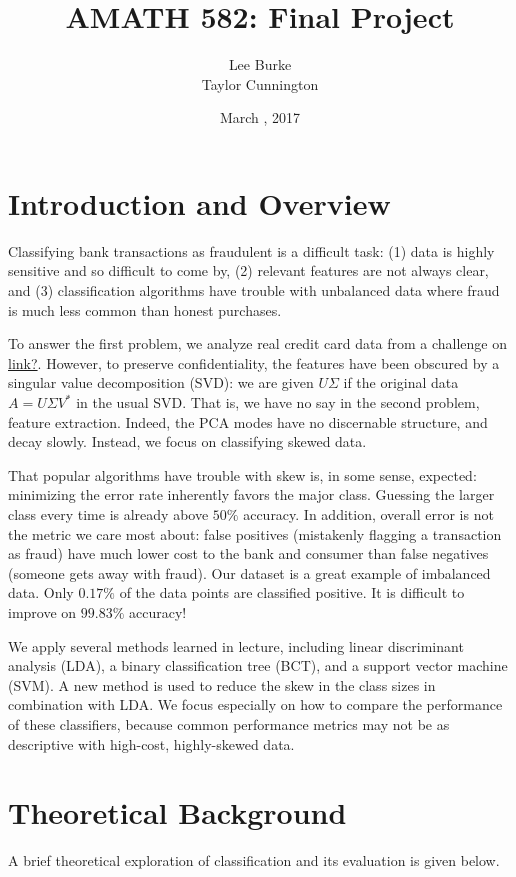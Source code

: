 \documentclass{article}
\title{AMATH 582: Final Project}
\date{March \nth{16}, 2017}
\author{Lee Burke \\ Taylor Cunnington}
\begin{document}
\maketitle
\abstract{
}
\section{Introduction and Overview}
Classifying bank transactions as fraudulent is a difficult task: (1) data is highly sensitive and so difficult to come by, (2) relevant features are not always clear, and (3) classification algorithms have trouble with unbalanced data where fraud is much less common than honest purchases. 


To answer the first problem, we analyze real credit card data from a challenge on \href{kaggle.com}{link?}. However, to preserve confidentiality, the features have been obscured by a singular value decomposition (SVD): we are given $U\Sigma$ if the original data $A=U\Sigma V^\ast$ in the usual SVD. That is, we have no say in the second problem, feature extraction. Indeed, the PCA modes have no discernable structure, and decay slowly. Instead, we focus on classifying skewed data.

That popular algorithms have trouble with skew is, in some sense, expected: minimizing the error rate inherently favors the major class. Guessing the larger class every time is already above $50\%$ accuracy. In addition, overall error is not the metric we care most about: false positives (mistakenly flagging a transaction as fraud) have much lower cost to the bank and consumer than false negatives (someone gets away with fraud). Our dataset is a great example of imbalanced data. Only $0.17\%$ of the data points are classified positive. It is difficult to improve on $99.83\%$ accuracy!

We apply several methods learned in lecture, including linear discriminant analysis (LDA), a binary classification tree (BCT), and a support vector machine (SVM). A new method is used to reduce the skew in the class sizes in combination with LDA. We focus especially on how to compare the performance of these classifiers, because common performance metrics may not be as descriptive with high-cost, highly-skewed data.

\section{Theoretical Background}
A brief theoretical exploration of classification and its evaluation is given below.
\end{document}
